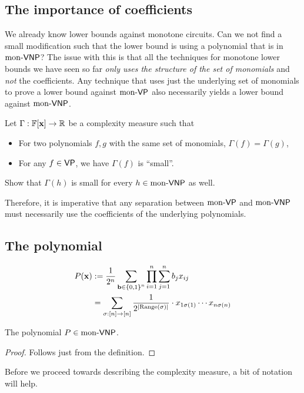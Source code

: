 \subsection*{The importance of coefficients}

We already know lower bounds against monotone circuits. Can we not find a small modification such that the lower bound is using a polynomial that is in $\mathrm{mon}\text{-}\mathsf{VNP}$? The issue with this is that all the techniques for monotone lower bounds we have seen so far \emph{only uses the structure of the set of monomials} and \emph{not} the coefficients. Any technique that uses just the underlying set of monomials to prove a lower bound against $\mathrm{mon}\text{-}\mathsf{VP}$ also necessarily yields a lower bound against $\mathrm{mon}\text{-}\mathsf{VNP}$.

\begin{exercise}
  Let $\Gamma:\mathbb{F}[\mathbf{x}] \rightarrow \mathbb{R}$ be a complexity measure such that
  \begin{itemize}
  \item For two polynomials $f,g$ with the same set of monomials, $\Gamma(f) = \Gamma(g)$,
  \item For any $f \in \mathsf{VP}$, we have $\Gamma(f)$ is ``small''.
  \end{itemize}
  Show that $\Gamma(h)$ is small for every $h \in \mathrm{mon}\text{-}\mathsf{VNP}$ as well.
\end{exercise}

Therefore, it is imperative that any separation between $\mathrm{mon}\text{-}\mathsf{VP}$ and $\mathrm{mon}\text{-}\mathsf{VNP}$ must necessarily use the coefficients of the underlying polynomials.

\subsection*{The polynomial}

\begin{align*}
  P(\mathbf{x}) & := \frac{1}{2^n} \sum_{\mathbf{b} \in \left\{0,1\right\}^n} \prod_{i=1}^n \sum_{j=1}^n b_j x_{ij}\\
           & = \sum_{\sigma: [n] \rightarrow [n]} \frac{1}{2^{\left|\operatorname{Range}(\sigma)\right|}} \cdot x_{1\sigma(1)} \cdots x_{n\sigma(n)}
\end{align*}

\begin{lemma}
  The polynomial $P \in \mathrm{mon}\text{-}\mathsf{VNP}$.
\end{lemma}
\begin{proof}
  Follows just from the definition.
\end{proof}

Before we proceed towards describing the complexity measure, a bit of notation will help.

